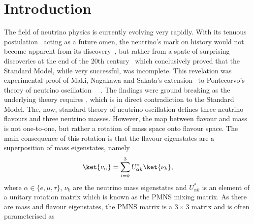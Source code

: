 \chapter{Introduction}
\label{chap:Introduction}


The field of neutrino physics is currently evolving very rapidly.  With its tenuous postulation~\cite{PauliOpenLetter} acting as a future omen, the neutrino's mark on history would not become apparent from its discovery~\cite{Cowan20071956, PhysRevLett.9.36, Kodama2001218}, but rather from a spate of surprising discoveries at the end of the 20th century~\cite{PhysRevLett.81.1562, PhysRevLett.87.071301, PhysRevLett.90.021802} which conclusively proved that the Standard Model, while very successful, was incomplete.  This revelation was experimental proof of Maki, Nagakawa and Sakata's extension~\cite{Maki01111962} to Pontecorvo's theory of neutrino oscillation~\cite{Pontecorvo} ~\cite{PhysRevD.17.2369,Mikheev:1986gs}.  The findings were ground breaking as the underlying theory requires , which is in direct contradiction to the Standard Model.  The, now, standard theory of neutrino oscillation defines three neutrino flavours and three neutrino masses.  However, the map between flavour and mass is not one-to-one, but rather a rotation of mass space onto flavour space.  The main consequence of this rotation is that the flavour eigenstates are a superposition of mass eigenstates, namely
\begin{equation}
\ket{\nu_\alpha} = \sum^{3}_{i=k}U^{\ast}_{\alpha k}\ket{\nu_k},
\label{eq:NeutrinoEigenstates}
\end{equation}
where $\alpha \in \{e,\mu, \tau\}$, $\nu_k$ are the neutrino mass eigenstates and $U^{\ast}_{\alpha k}$ is an element of a unitary rotation matrix which is known as the PMNS mixing matrix.  As there are  mass and flavour eigenstates, the PMNS matrix is a $3\times3$ matrix and is often parameterised as 
